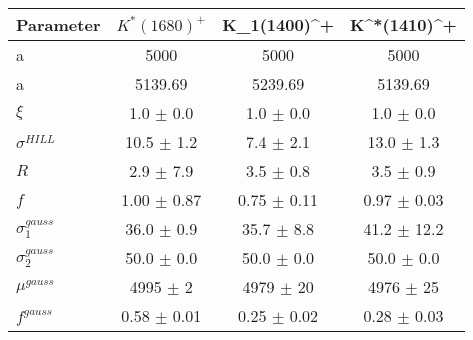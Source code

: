 \begin{table}[h]
    \centering
    \begin{tabular}{lccc}
        \toprule
        Parameter & $K^*(1680)^+$ & K_1(1400)^+ & K^*(1410)^+ \\
        \midrule
      a & 5000 & 5000 & 5000 \\
      a & 5139.69 & 5239.69 & 5139.69 \\
      $\xi$ & 1.0 $\pm$ 0.0 & 1.0 $\pm$ 0.0 & 1.0 $\pm$ 0.0 \\
      $\sigma^{HILL}$ & 10.5 $\pm$ 1.2 & 7.4 $\pm$ 2.1 & 13.0 $\pm$ 1.3 \\
      $R$ & 2.9 $\pm$ 7.9 & 3.5 $\pm$ 0.8 & 3.5 $\pm$ 0.9 \\
      $f$ & 1.00 $\pm$ 0.87 & 0.75 $\pm$ 0.11 & 0.97 $\pm$ 0.03 \\
      $\sigma_1^{gauss}$ & 36.0 $\pm$ 0.9 & 35.7 $\pm$ 8.8 & 41.2 $\pm$ 12.2 \\
      $\sigma_2^{gauss}$ & 50.0 $\pm$ 0.0 & 50.0 $\pm$ 0.0 & 50.0 $\pm$ 0.0 \\
      $\mu^{gauss}$ & 4995 $\pm$ 2 & 4979 $\pm$ 20 & 4976 $\pm$ 25 \\
      $f^{gauss}$ & 0.58 $\pm$ 0.01 & 0.25 $\pm$ 0.02 & 0.28 $\pm$ 0.03 \\
  \bottomrule
  \end{tabular}
\end{table}
